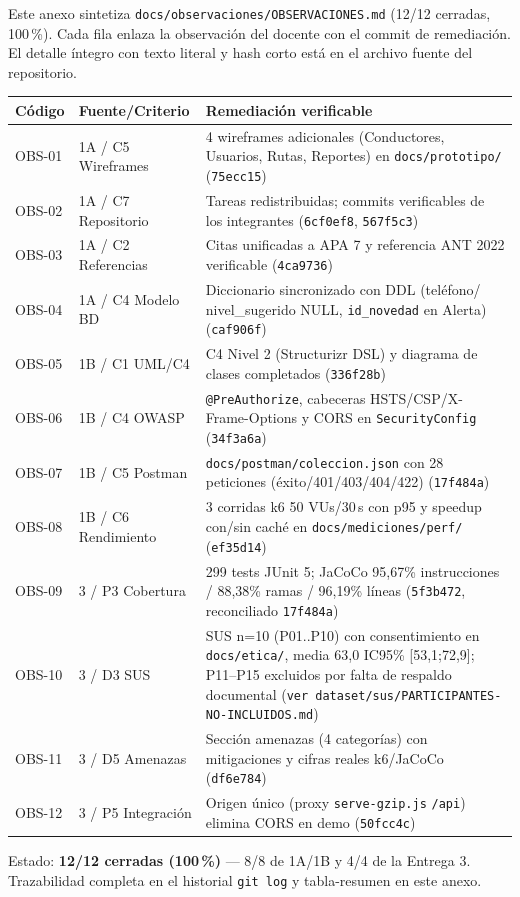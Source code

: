 Este anexo sintetiza \texttt{docs/observaciones/OBSERVACIONES.md} (12/12 cerradas, 100\,\%). Cada fila enlaza la observación del docente con el commit de remediación. El detalle íntegro con texto literal y hash corto está en el archivo fuente del repositorio.

\begin{longtable}{p{1.4cm}p{2.2cm}p{8.5cm}}
\toprule
\textbf{Código} & \textbf{Fuente/Criterio} & \textbf{Remediación verificable} \\
\midrule
OBS-01 & 1A / C5 Wireframes & 4 wireframes adicionales (Conductores, Usuarios, Rutas, Reportes) en \texttt{docs/prototipo/} (\texttt{75ecc15}) \\
OBS-02 & 1A / C7 Repositorio & Tareas redistribuidas; commits verificables de los integrantes (\texttt{6cf0ef8}, \texttt{567f5c3}) \\
OBS-03 & 1A / C2 Referencias & Citas unificadas a APA 7 y referencia ANT 2022 verificable (\texttt{4ca9736}) \\
OBS-04 & 1A / C4 Modelo BD & Diccionario sincronizado con DDL (teléfono/ nivel\_sugerido NULL, \texttt{id\_novedad} en Alerta) (\texttt{caf906f}) \\
OBS-05 & 1B / C1 UML/C4 & C4 Nivel 2 (Structurizr DSL) y diagrama de clases completados (\texttt{336f28b}) \\
OBS-06 & 1B / C4 OWASP & \texttt{@PreAuthorize}, cabeceras HSTS/CSP/X-Frame-Options y CORS en \texttt{SecurityConfig} (\texttt{34f3a6a}) \\
OBS-07 & 1B / C5 Postman & \texttt{docs/postman/coleccion.json} con 28 peticiones (éxito/401/403/404/422) (\texttt{17f484a}) \\
OBS-08 & 1B / C6 Rendimiento & 3 corridas k6 50 VUs/30\,s con p95 y speedup con/sin caché en \texttt{docs/mediciones/perf/} (\texttt{ef35d14}) \\
OBS-09 & 3 / P3 Cobertura & 299 tests JUnit 5; JaCoCo 95,67\% instrucciones / 88,38\% ramas / 96,19\% líneas (\texttt{5f3b472}, reconciliado \texttt{17f484a}) \\
OBS-10 & 3 / D3 SUS & SUS n=10 (P01..P10) con consentimiento en \texttt{docs/etica/}, media 63,0 IC95\% [53,1;72,9]; P11--P15 excluidos por falta de respaldo documental (\texttt{ver dataset/sus/PARTICIPANTES-NO-INCLUIDOS.md}) \\
OBS-11 & 3 / D5 Amenazas & Sección amenazas (4 categorías) con mitigaciones y cifras reales k6/JaCoCo (\texttt{df6e784}) \\
OBS-12 & 3 / P5 Integración & Origen único (proxy \texttt{serve-gzip.js} \texttt{/api}) elimina CORS en demo (\texttt{50fcc4c}) \\
\bottomrule
\end{longtable}

\noindent Estado: \textbf{12/12 cerradas (100\,\%)} — 8/8 de 1A/1B y 4/4 de la Entrega 3. Trazabilidad completa en el historial \texttt{git log} y tabla-resumen en este anexo.
